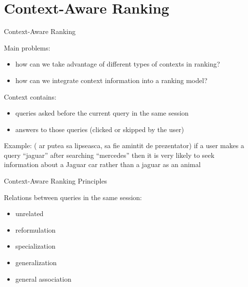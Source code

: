 \section{Context-Aware Ranking}


\begin{frame}{Context-Aware Ranking}

Main problems:
\begin{itemize}
	\item how can we take advantage of different types of contexts in ranking?
	\item how can we integrate context information into a ranking model? \newline
\end{itemize}

Context contains:
\begin{itemize}
	\item queries asked before the current query in the same session
	\item answers to those queries (clicked or skipped by the user) \newline
\end{itemize}

Example: ({\color{red} ar putea sa lipseasca, sa fie amintit de prezentator}) \newline
	if a user makes a query “jaguar” after searching “mercedes” then it is very likely to seek information about a Jaguar car rather than a jaguar as an animal

\end{frame}


\begin{frame}{Context-Aware Ranking Principles}

Relations between queries in the same session:
\begin{itemize}
	\item unrelated
	\item reformulation
	\item specialization
	\item generalization
	\item general association
\end{itemize}

\end{frame}


